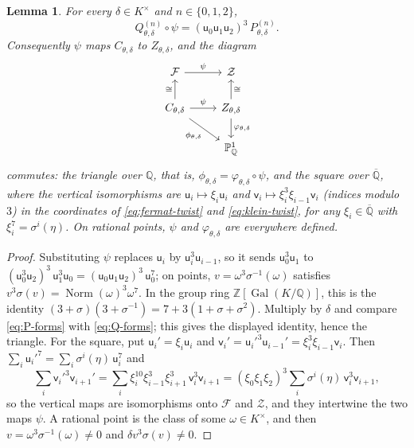 \documentclass[12pt]{amsart}
\renewcommand{\P}{\mathbb{P}}
\newcommand{\Q}{\mathbb{Q}}
\newcommand{\Z}{\mathbb{Z}}
\newcommand{\Qbar}{{\overline{\Q}}}
\newcommand{\Pone}{\P^{1}}
\newcommand{\calF}{{\mathcal F}}
\newcommand{\calZ}{{\mathcal Z}}
\newcommand{\sfu}{\mathsf{u}}
\newcommand{\sfv}{\mathsf{v}}
\DeclareMathOperator{\Gal}{Gal}
\DeclareMathOperator{\Norm}{Norm}
\numberwithin{equation}{section}
\newtheorem{lemma}[theorem]{Lemma}
\theoremstyle{definition}
\begin{document}
\begin{lemma}
  \label{lem:quotient-map}
  For every $\delta \in K^{\times}$ and $n \in \{0,1,2\}$,
  \[
    Q^{(n)}_{\theta,\delta} \circ \psi
    = (\sfu_0\sfu_1\sfu_2)^{3}\, P^{(n)}_{\theta,\delta} .
  \]
  Consequently $\psi$ maps $C_{\theta,\delta}$ to $Z_{\theta,\delta}$, and the
  diagram
  \[
    \begin{tikzcd}
      \calF \arrow[r, "\psi"] & \calZ \\
      C_{\theta,\delta} \arrow[r, "\psi"] \arrow[u, "\cong"]
        \arrow[dr, "\phi_{\theta,\delta}"'] &
      Z_{\theta,\delta} \arrow[u, "\cong"'] \arrow[d, "\varphi_{\theta,\delta}"] \\
      & \Pone_{\Q}
    \end{tikzcd}
  \]
  commutes: the triangle over $\Q$, that is, $\phi_{\theta,\delta} =
  \varphi_{\theta,\delta} \circ \psi$, and the square over $\Qbar$, where the
  vertical isomorphisms are $\sfu_i \mapsto \xi_i\sfu_i$ and $\sfv_i
  \mapsto \xi_i^{3}\xi_{i-1}\sfv_i$ (indices modulo $3$) in the
  coordinates of \cref{eq:fermat-twist} and \cref{eq:klein-twist}, for any
  $\xi_i \in \Qbar$ with $\xi_i^7 = \sigma^i(\eta)$. On rational
  points, $\psi$ and $\varphi_{\theta,\delta}$ are everywhere defined.
\end{lemma}
\begin{proof}
  Substituting $\psi$ replaces $\sfu_i$ by $\sfu_i^3\sfu_{i-1}$, so it sends
  $\sfu_0^3\sfu_1$ to $(\sfu_0^3\sfu_2)^3\,\sfu_1^3\sfu_0 =
  (\sfu_0\sfu_1\sfu_2)^3\,\sfu_0^7$; on points, $v = \omega^3\sigma^{-1}(\omega)$
  satisfies $v^3\sigma(v) = \Norm(\omega)^3\omega^7$. In the group ring $\Z[\Gal(K/\Q)]$, this is the
  identity $(3 + \sigma)(3 + \sigma^{-1}) = 7 + 3(1 + \sigma + \sigma^{2})$.
  Multiply by $\delta$ and compare \cref{eq:P-forms} with \cref{eq:Q-forms}; this
  gives the displayed identity, hence the triangle. For the square, put
  $\sfu_i' = \xi_i\sfu_i$ and $\sfv_i' = \sfu_i'^{3}\sfu_{i-1}' =
  \xi_i^3\xi_{i-1}\sfv_i$. Then $\sum_i \sfu_i'^{7} = \sum_i
  \sigma^i(\eta)\,\sfu_i^7$ and
  \[
    \sum_i \sfv_i'^{3}\sfv_{i+1}'
    = \sum_i \xi_i^{10}\xi_{i-1}^{3}\xi_{i+1}^{3}\,\sfv_i^3\sfv_{i+1}
    = (\xi_0\xi_1\xi_2)^{3} \sum_i \sigma^i(\eta)\,\sfv_i^3\sfv_{i+1},
  \]
  so the vertical maps are isomorphisms onto $\calF$ and $\calZ$, and they
  intertwine the two maps $\psi$. A rational point is the class of some $\omega
  \in K^{\times}$, and then $v = \omega^3\sigma^{-1}(\omega) \neq 0$ and $\delta
  v^3\sigma(v) \neq 0$.
\end{proof}
\end{document}

